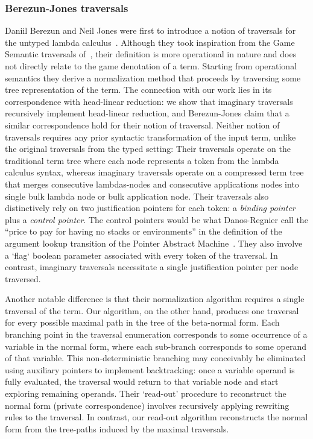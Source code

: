 \documentclass{elsarticle}
\theoremstyle{plain}
\theoremstyle{definition}
\begin{document}
\subsubsection{Berezun-Jones traversals}

Daniil Berezun and Neil Jones were first to introduce a notion of traversals for the untyped lambda calculus~\cite{JonesBerezunLLL-PEPM17}.
Although they took inspiration from the Game Semantic traversals of~\cite{OngLics2006,BlumGalop2008}, their definition is more operational in nature and does not directly relate to the game denotation of a term. Starting from operational semantics they derive a normalization method that proceeds by traversing some tree representation of the term.
%
The connection with our work lies in its correspondence with head-linear reduction: we show that imaginary traversals recursively implement head-linear reduction, and Berezun-Jones claim that a similar correspondence hold for their notion of traversal.
%
Neither notion of traversals requires any prior syntactic transformation of the input term, unlike the original traversals from the typed setting:
Their traversals operate on the traditional term tree where each node represents a token from the lambda calculus syntax,
whereas imaginary traversals operate on a compressed term tree that merges consecutive lambdas-nodes and consecutive applications nodes into single bulk lambda node or bulk application node.
%
Their traversals also distinctively rely on two justification pointers for each token: a \emph{binding pointer} plus a \emph{control pointer}. The control pointers would be what Danos-Regnier call the ``price to pay for having no stacks or environments'' in the definition of the argument lookup transition of the Pointer Abstract Machine~\cite{danos-head}. They also involve a `flag` boolean parameter associated with every token of the traversal.
In contrast, imaginary traversals necessitate a single justification pointer per node traversed.

Another notable difference is that their normalization algorithm requires a single traversal of the term. Our algorithm, on the other hand, produces one traversal for every possible maximal path in the tree of the beta-normal form. Each branching point in the traversal enumeration corresponds to some occurrence of a variable in the normal form, where each sub-branch corresponds to some operand of that variable. This non-deterministic branching may conceivably be eliminated using auxiliary pointers to implement backtracking: once a variable operand is fully evaluated, the traversal would return to that variable node and start exploring remaining operands.
%
Their `read-out' procedure to reconstruct the normal form (private correspondence) involves recursively applying rewriting rules to the traversal. In contrast, our read-out algorithm reconstructs the normal form from the tree-paths induced by the maximal traversals.
\end{document}
